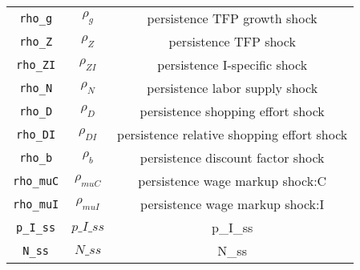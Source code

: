 \begin{center}
\begin{longtable}{ccc}
\texttt{rho\_g} & ${\rho_g}$ & persistence TFP growth shock\\
\texttt{rho\_Z} & ${\rho_Z}$ & persistence TFP shock\\
\texttt{rho\_ZI} & ${\rho_{ZI}}$ & persistence I-specific shock\\
\texttt{rho\_N} & ${\rho_N}$ & persistence labor supply shock\\
\texttt{rho\_D} & ${\rho_D}$ & persistence shopping effort shock\\
\texttt{rho\_DI} & ${\rho_{DI}}$ & persistence relative shopping effort shock\\
\texttt{rho\_b} & ${\rho_b}$ & persistence discount factor shock\\
\texttt{rho\_muC} & ${\rho_{muC}}$ & persistence wage markup shock:C\\
\texttt{rho\_muI} & ${\rho_{muI}}$ & persistence wage markup shock:I\\
\texttt{p\_I\_ss} & $p\_I\_ss$ & p\_I\_ss\\
\texttt{N\_ss} & $N\_ss$ & N\_ss\\
\hline%
\end{longtable}
\end{center}
